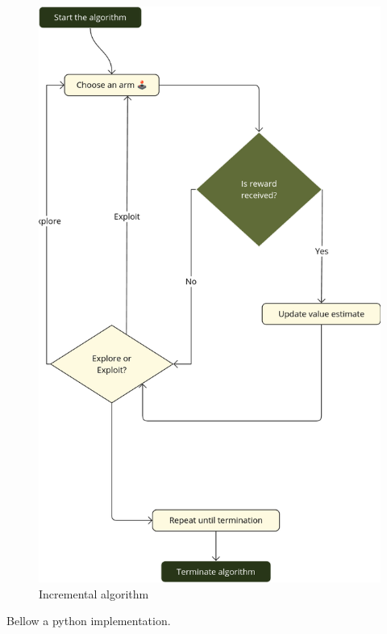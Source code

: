 \documentclass[
  letterpaper,
]{krantz}
\theoremstyle{plain}
\theoremstyle{definition}
\theoremstyle{definition}
\theoremstyle{remark}
\begin{document}
\begin{figure}[H]

{\centering \includegraphics{assets/ch_03/mab_simple_algorithm.png}

}

\caption{Incremental algorithm}

\end{figure}%

Bellow a python implementation.
\end{document}
